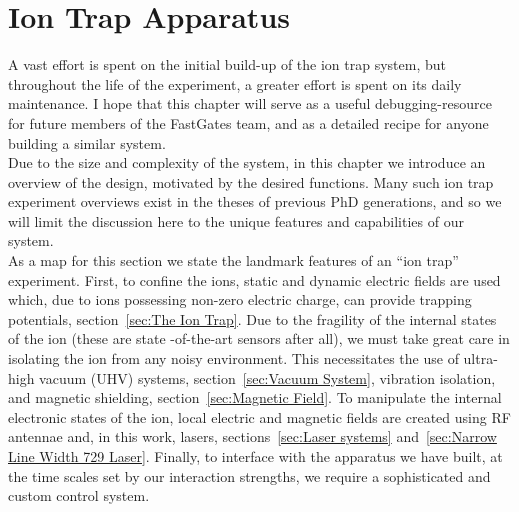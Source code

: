 \chapter{Ion Trap Apparatus}
\minitoc

    A vast effort is spent on the initial build-up of the ion trap system, but
    throughout the life of the experiment, a greater effort is spent on its daily
    maintenance.  I hope that this chapter will serve as a useful debugging-resource for future
    members of the FastGates team, and as a detailed recipe for anyone
    building a similar system. \\

    Due to the size and complexity of the system, in this chapter we introduce an overview of
    the design, motivated by the desired functions.  
    Many such  ion trap experiment overviews exist in the theses of previous PhD
    generations, and so we will limit the discussion here to the unique features
    and capabilities of our system.\\
    As a map for this section we state the landmark features of an ``ion trap''
    experiment. First, to confine the ions, static and dynamic electric fields
    are used which, due to ions possessing non-zero electric charge, can provide
    trapping potentials, section~\ref{sec:The Ion Trap}. Due to the fragility of
    the internal states of the ion (these are state -of-the-art sensors after
    all), we must take great care in isolating the ion from any noisy
    environment. This necessitates the use of ultra-high vacuum (UHV) systems,
    section~\ref{sec:Vacuum System}, vibration isolation, and magnetic
    shielding, section~\ref{sec:Magnetic Field}. To manipulate the internal
    electronic states of the ion, local electric and magnetic fields
    are created using RF antennae and, in this work, lasers, sections~\ref{sec:Laser
    systems} and~\ref{sec:Narrow Line Width 729 Laser}.  Finally, to interface
    with the apparatus we have built, at the time scales set by our interaction
    strengths, we require a sophisticated and custom control system.



